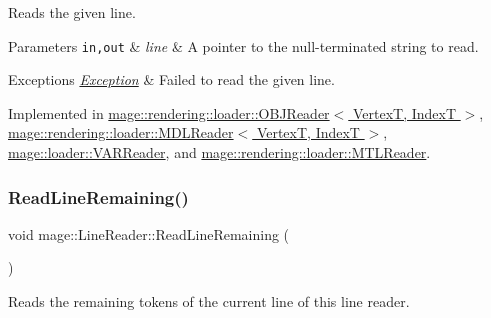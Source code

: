 Reads the given line.


\begin{DoxyParams}[1]{Parameters}
\mbox{\tt in,out}  & {\em line} & A pointer to the null-\/terminated string to read. \\
\hline
\end{DoxyParams}

\begin{DoxyExceptions}{Exceptions}
{\em \hyperlink{classmage_1_1_exception}{Exception}} & Failed to read the given line. \\
\hline
\end{DoxyExceptions}


Implemented in \hyperlink{classmage_1_1rendering_1_1loader_1_1_o_b_j_reader_a6552753d2295585283df035732f38dbd}{mage\+::rendering\+::loader\+::\+O\+B\+J\+Reader$<$ Vertex\+T, Index\+T $>$}, \hyperlink{classmage_1_1rendering_1_1loader_1_1_m_d_l_reader_a121bfa0a48d01bdc37cf09b7f3a25a27}{mage\+::rendering\+::loader\+::\+M\+D\+L\+Reader$<$ Vertex\+T, Index\+T $>$}, \hyperlink{classmage_1_1loader_1_1_v_a_r_reader_a511a0778cc515aece781bfdb76024cea}{mage\+::loader\+::\+V\+A\+R\+Reader}, and \hyperlink{classmage_1_1rendering_1_1loader_1_1_m_t_l_reader_a54eb83757c915ebca73175e83737cf73}{mage\+::rendering\+::loader\+::\+M\+T\+L\+Reader}.

\hypertarget{classmage_1_1_line_reader_a3a4b99bfef1e8a826d74a01bcc663fcb}{}\label{classmage_1_1_line_reader_a3a4b99bfef1e8a826d74a01bcc663fcb} 
\subsubsection{\texorpdfstring{Read\+Line\+Remaining()}{ReadLineRemaining()}}
{\footnotesize\ttfamily void mage\+::\+Line\+Reader\+::\+Read\+Line\+Remaining (\begin{DoxyParamCaption}{ }\end{DoxyParamCaption})\hspace{0.3cm}{\ttfamily [protected]}}

Reads the remaining tokens of the current line of this line reader. \hypertarget{classmage_1_1_line_reader_ae9a7547d01b29c3237b198444d4f3aef}{}\label{classmage_1_1_line_reader_ae9a7547d01b29c3237b198444d4f3aef} 
